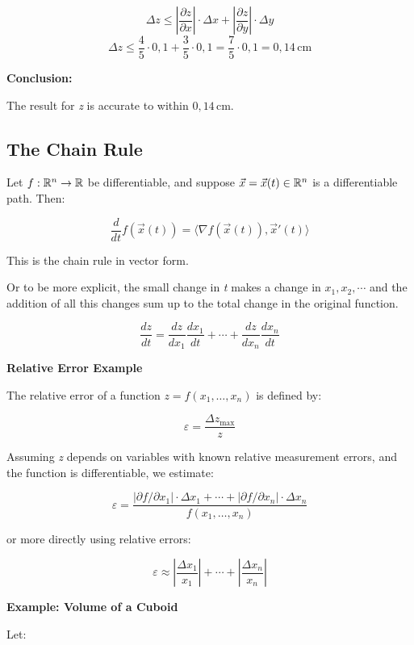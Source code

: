 \[
    \Delta z \leq \left| \frac{\partial z}{\partial x} \right| \cdot \Delta x + \left| \frac{\partial z}
    {\partial y} \right| \cdot \Delta y
\]
\[
    \Delta z \leq \frac{4}{5} \cdot 0{,}1 + \frac{3}{5} \cdot 0{,}1 = \frac{7}{5} \cdot 0{,}1 = 0{,}14 \, 
    \text{cm}
\]

\textbf{Conclusion:}  

The result for \emph{z} is accurate to within \( \boxed{0{,}14 \, \text{cm}} \).


\subsection{The Chain Rule}

Let \( f : \mathbb{R}^n \to \mathbb{R} \) be differentiable, and suppose \( \vec{x} = \vec{x}(t) \in \mathbb{R}^n \) 
is a differentiable path. Then:

\[
    \frac{d}{dt} f(\vec{x}(t)) = \langle \nabla f(\vec{x}(t)), \vec{x}'(t) \rangle
\]

This is the chain rule in vector form.

Or to be more explicit, the small change in \emph{t} makes a change in \(x_1, x_2, \cdots\) and the addition 
of all this changes sum up to the total change in the original function.

\[
    \frac{dz}{dt} = \frac{dz}{dx_1}\frac{dx_1}{dt} + \cdots + \frac{dz}{dx_n}\frac{dx_n}{dt}
\]

\textbf{Relative Error Example}
\vspace{\baselineskip}

The relative error of a function \( z = f(x_1, \dots, x_n) \) is defined by:

\[
    \varepsilon = \frac{\Delta z_{\max}}{z}
\]

Assuming \emph{z} depends on variables with known relative measurement errors, and the function is 
differentiable, we estimate:

\[
    \varepsilon = \frac{|\partial f / \partial x_1| \cdot \Delta x_1 + \cdots + |\partial f / 
    \partial x_n| \cdot \Delta x_n}{f(x_1, \dots, x_n)}
\]

or more directly using relative errors:

\[
    \varepsilon \approx \left| \frac{\Delta x_1}{x_1} \right| + \cdots + \left| \frac{\Delta x_n}{x_n} 
    \right|
\]

\textbf{Example: Volume of a Cuboid}
\vspace{\baselineskip}

Let:

